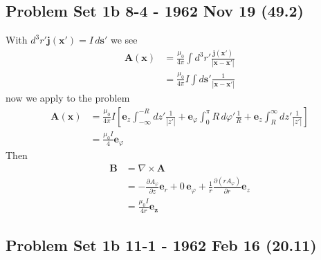 \documentclass[../main.tex]{subfiles}
\begin{document}
\subsection{Problem Set 1b 8-4 - 1962 Nov 19 (49.2)}
With $d^3r' \mathbf{j}(\mathbf{x'})=I\,d\mathbf{s}'$ we see
\begin{align}
\mathbf{A}(\mathbf{x})
&=\frac{\mu_0}{4\pi}\int d^3r'\frac{\mathbf{j}(\mathbf{x'})}{|\mathbf{x}-\mathbf{x}'|}\\
&=\frac{\mu_0}{4\pi}I\int d\mathbf{s}'\frac{1}{|\mathbf{x}-\mathbf{x}'|}
\end{align}
now we apply to the problem
\begin{align}
\mathbf{A}(\mathbf{x})
&=\frac{\mu_0}{4\pi}I\left[\mathbf{e}_z\int_{-\infty}^{-R} dz'\frac{1}{|z'|}+\mathbf{e}_\varphi\int_0^\pi R\,d\varphi'\frac{1}{R}+\mathbf{e}_z\int^\infty_R dz'\frac{1}{|z'|}\right]\\
&=\frac{\mu_0I}{4}\mathbf{e}_\varphi
\end{align}
Then
\begin{align}
\mathbf{B}&=\nabla\times\mathbf{A}\\
&=-\frac{\partial A_\varphi}{\partial z}\mathbf{e}_r+0\,\mathbf{e}_\varphi+\frac{1}{r}\frac{\partial (rA_\varphi)}{\partial r}\mathbf{e}_z\\
&=\frac{\mu_0I}{4r}\mathbf{e_z}
\end{align}

\subsection{Problem Set 1b 11-1 - 1962 Feb 16 (20.11)}
\end{document}
